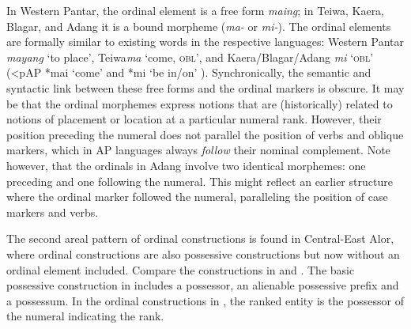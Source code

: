 \let\eachwordone=\itshape
\let\eachwordtwo=\upshape
\let\eachwordthree=\upshape
\let\eachwordfour=\upshape
\let\eachwordfive=\upshape 

In Western Pantar, the ordinal element is a free form \textit{maing}; in Teiwa, Kaera, Blagar, and Adang it is a bound morpheme (\textit{ma-} or \textit{mi-}). The ordinal elements are formally similar to existing words in the respective languages: Western Pantar \textit{mayang} `to place', Teiwa\textit{ma} `come, \textsc{obl}', and Kaera/Blagar/Adang \textit{mi} `\textsc{obl' (}{\textless}pAP *mai `come' and *mi `be in/on' \citealt{HoltonRobinsonTVhistory}). Synchronically, the semantic and syntactic link between these free forms and the ordinal markers is obscure. It may be that the ordinal morphemes express notions that are (historically) related to notions of placement or location at a particular numeral rank. However, their position preceding the numeral does not parallel the position of verbs and oblique markers, which in AP languages always \textit{follow} their nominal complement. Note however, that the ordinals in Adang involve two identical morphemes: one preceding and one following the numeral. This might reflect an earlier structure where the ordinal marker followed the numeral, paralleling the position of case markers and verbs.

The second areal pattern of ordinal constructions is found in Central-East Alor, where ordinal constructions are also possessive constructions but now without an ordinal element included. Compare the constructions in  and . The basic possessive construction in  includes a possessor, an alienable possessive prefix and a possessum. In the ordinal constructions in , the ranked entity is the possessor of the numeral indicating the rank.


\let\eachwordone=\itshape
\let\eachwordtwo=\itshape 


